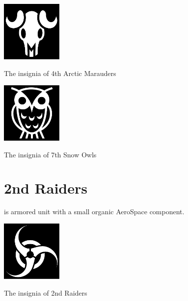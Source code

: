 \documentclass{tufte-book}
\begin{document}
\begin{marginfigure}[0\baselineskip]
  \includegraphics[width=3cm]{desert-skull}
  \caption{The insignia of 4th Arctic Marauders}
  \label{fig:arctic_marauders}
\end{marginfigure}


\bigskip
{}

\begin{marginfigure}[0\baselineskip]
  \includegraphics[width=3cm]{owl}
  \caption{The insignia of 7th Snow Owls}
  \label{fig:snow_owls}
\end{marginfigure}

\section{2nd Raiders}

 is armored unit with a small organic AeroSpace
component.

\begin{marginfigure}[0\baselineskip]
  \includegraphics[width=3cm]{regeneration}
  \caption{The insignia of 2nd Raiders}
  \label{fig:raiders}
\end{marginfigure}
\end{document}
